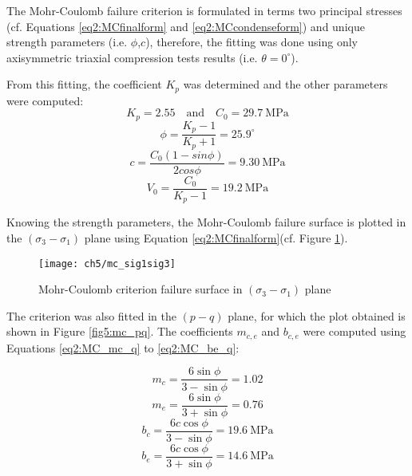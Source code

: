 The Mohr-Coulomb failure criterion is formulated in terms two principal stresses (cf. Equations \ref{eq2:MCfinalform} and \ref{eq2:MCcondenseform}) and unique strength parameters (i.e. $\phi$,$c$), therefore, the fitting was done using only axisymmetric triaxial compression tests results (i.e. $\theta = 0^\circ$). 

From this fitting, the coefficient $K_p$ was determined and the other parameters were computed: 
\begin{equation}
    K_p = 2.55 \quad \textrm{and} \quad C_0 = \SI{29.7}{\mega\pascal}
\end{equation}
\begin{equation}
    \phi = \frac{K_p-1}{K_p+1} = 25.9^\circ
\end{equation}
\begin{equation}
    c = \frac{C_0(1-sin\phi)}{2cos\phi} = \SI{9.30}{\mega\pascal}
\end{equation}
\begin{equation}
    V_0 = \frac{C_0}{K_p-1} = \SI{19.2}{\mega\pascal}
\end{equation}

Knowing the strength parameters, the Mohr-Coulomb failure surface is plotted in the $(\sigma_3-\sigma_1)$ plane using Equation \ref{eq2:MCfinalform}(cf. Figure \ref{fig5:mc_sig1sig3}).

\begin{figure}[p]
    \centering
    \texttt{[image: ch5/mc\_sig1sig3]}
    \caption{Mohr-Coulomb criterion failure surface in  $(\sigma_3-\sigma_1)$ plane}
    \label{fig5:mc_sig1sig3}
\end{figure} 

The criterion was also fitted in the $(p-q)$ plane, for which the plot obtained is shown in Figure \ref{fig5:mc_pq}. The coefficients $m_{c,e}$ and $b_{c,e}$ were computed using Equations \ref{eq2:MC_mc_q} to \ref{eq2:MC_be_q}:

\begin{equation}
    m_c = \frac{6 \sin \phi}{3-\sin \phi} = 1.02
\end{equation}
\begin{equation}
    m_e = \frac{6 \sin \phi}{3+\sin \phi} = 0.76
\end{equation}
\begin{equation}
    b_c = \frac{6 c \cos \phi}{3-\sin \phi} = \SI{19.6}{\mega\pascal}
\end{equation}
\begin{equation}
    b_e = \frac{6 c \cos \phi}{3+\sin \phi} = \SI{14.6}{\mega\pascal}
\end{equation}


